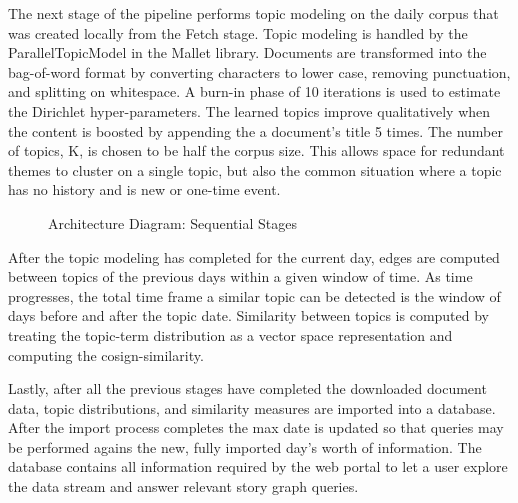 \documentclass[10pt,twocolumn]{article}
\begin{document}
The next stage of the pipeline performs topic modeling on the daily corpus that was created locally from the Fetch stage.  Topic modeling is handled by the ParallelTopicModel in the Mallet library.  Documents are transformed into the bag-of-word format by converting characters to lower case, removing punctuation, and splitting on whitespace.  A burn-in phase of 10 iterations is used to estimate the Dirichlet hyper-parameters. The learned topics improve qualitatively when the content is boosted by appending the a document's title 5 times.  The number of topics, K, is chosen to be half the corpus size.  This allows space for redundant themes to cluster on a single topic, but also the common situation where a topic has no history and is new or one-time event.

\begin{figure}[htp] 
\caption{Architecture Diagram: Sequential Stages}
\end{figure}  

After the topic modeling has completed for the current day, edges are computed between topics of the previous days within a given window of time.  As time progresses, the total time frame a similar topic can be detected is the window of days before and after the topic date.  Similarity between topics is computed by treating the topic-term distribution as a vector space representation and computing the cosign-similarity.  

Lastly, after all the previous stages have completed the downloaded document data, topic distributions, and similarity measures are imported into a database.  After the import process completes the max date is updated so that queries may be performed agains the new, fully imported day's worth of information.  The database contains all information required by the web portal to let a user explore the data stream and answer relevant story graph queries.
\end{document}
